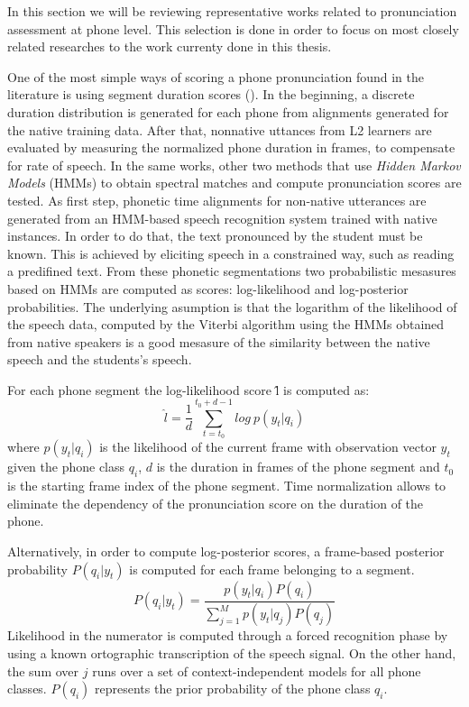 In this section we will be reviewing representative works related to pronunciation assessment
at phone level. This selection is done in order to focus on most closely related researches to
the work currenty done in this thesis.

One of the most simple ways of scoring a phone pronunciation found in the literature 
is using segment duration scores (\cite{pronunciation_scoring_instruction}\cite{pronunciation_scoring_phone_segments_instruction}). In the beginning, a discrete duration 
distribution is generated for each phone from alignments generated for the native 
training data. After that, nonnative uttances from L2 learners are evaluated by measuring the 
normalized phone duration in frames, to compensate for rate of speech. 
In the same works, other two methods that use \textit{Hidden Markov Models} (HMMs) to obtain 
spectral matches and compute pronunciation scores are tested. 
As first step, phonetic time alignments for
non-native utterances are generated from an HMM-based speech recognition system trained
with native instances. In order to do that, the text pronounced by the student 
must be known. This is achieved by eliciting speech in a
constrained way, such as reading a predifined text.
From these phonetic segmentations two 
probabilistic mesasures based on HMMs are computed as scores: log-likelihood and 
log-posterior probabilities. The underlying asumption is that the logarithm of the likelihood
of the speech data, computed by the Viterbi algorithm using the HMMs obtained from native
speakers is a good mesasure of the similarity between the native speech and the students's
speech.

For each phone segment the log-likelihood score \^{l} is computed as:
\begin{equation}
\hat{l} = \frac{1}{d} \sum_{t=t_{0}}^{t_{0}+d-1} log \ p(y_{t}|q_{i})
\end{equation}
where $p(y_{t}|q_{i})$ is the likelihood of the current frame with observation vector $y_{t}$
given the phone class $q_{i}$, $d$ is the duration in frames of the phone segment 
and $t_{0}$ is the starting frame index of the phone segment. Time normalization allows to 
eliminate the dependency of the pronunciation score on the duration of the phone.

Alternatively, in order to compute log-posterior scores, a frame-based posterior probability
$P(q_{i}|y_{t})$ is computed for each frame belonging to a segment.
\begin{equation}
P(q_{i}|y_{t}) = \frac{p(y_{t}|q_{i})P(q_{i})}{\sum\limits_{j=1}^{M} p(y_{t}|q_{j})P(q_{j})}
\end{equation}
Likelihood in the numerator is computed through a forced recognition phase by using a known 
ortographic transcription of the speech signal. On the other hand, 
the sum over $j$ runs over a set of context-independent models for all phone classes. $P(q_{i})$
represents the prior probability of the phone class $q_{i}$. 

